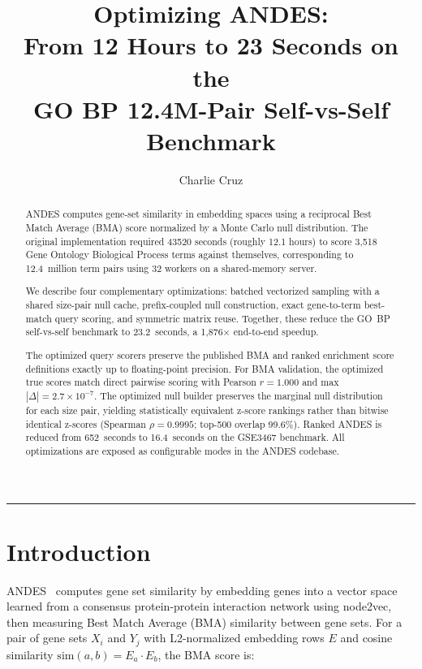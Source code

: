 \documentclass[11pt,a4paper]{article}
\title{%
  \vspace{-1cm}
  \textbf{Optimizing ANDES:}\\[4pt]
  \Large From 12 Hours to 23 Seconds on the\\
  GO BP 12.4M-Pair Self-vs-Self Benchmark%
}
\author{Charlie Cruz}
\date{}
\begin{document}
\maketitle
\thispagestyle{fancy}

\begin{abstract}
	\noindent
	ANDES computes gene-set similarity in embedding spaces using a reciprocal
	Best Match Average (BMA) score normalized by a Monte Carlo null distribution.
	The original implementation required \num{43520} seconds (roughly 12.1 hours)
	to score 3{,}518 Gene Ontology Biological Process terms against themselves,
	corresponding to 12.4~million term pairs using 32 workers on a shared-memory
	server.

	We describe four complementary optimizations: batched vectorized sampling
	with a shared size-pair null cache, prefix-coupled null construction, exact
	gene-to-term best-match query scoring, and symmetric matrix reuse. Together,
	these reduce the GO~BP self-vs-self benchmark to 23.2~seconds, a
		1{,}876$\times$ end-to-end speedup.

	The optimized query scorers preserve the published BMA and ranked enrichment
	score definitions exactly up to floating-point precision. For BMA validation,
	the optimized true scores match direct pairwise scoring with Pearson
	$r = 1.000$ and max $|\Delta| = 2.7 \times 10^{-7}$. The optimized null
	builder preserves the marginal null distribution for each size pair, yielding
	statistically equivalent z-score rankings rather than bitwise identical
	z-scores (Spearman $\rho = 0.9995$; top-500 overlap 99.6\%).
	Ranked ANDES is reduced from 652~seconds to 16.4~seconds on the GSE3467
	benchmark. All optimizations are exposed as configurable modes in the ANDES
	codebase.
\end{abstract}

\vspace{0.8em}
\hrule
\vspace{1.2em}

\section{Introduction}

ANDES~\cite{li2024andes} computes gene set similarity by embedding genes into
a vector space learned from a consensus protein-protein interaction network
using node2vec, then measuring Best Match Average (BMA) similarity between
gene sets. For a pair of gene sets $X_i$ and $Y_j$ with L2-normalized
embedding rows $E$ and cosine similarity
$\mathrm{sim}(a,b) = E_a \cdot E_b$, the BMA score is:
\end{document}
